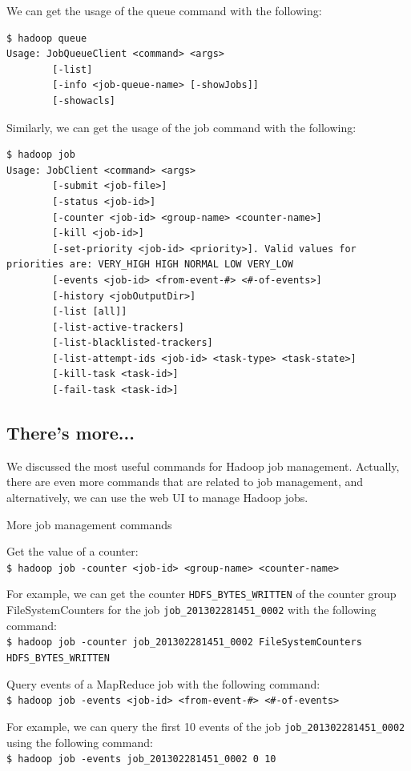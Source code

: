 We can get the usage of the queue command with the following:
\begin{verbatim}
$ hadoop queue
Usage: JobQueueClient <command> <args>
        [-list]
        [-info <job-queue-name> [-showJobs]]
        [-showacls]
\end{verbatim}

Similarly, we can get the usage of the job command with the following:
\begin{verbatim}
$ hadoop job
Usage: JobClient <command> <args>
        [-submit <job-file>]
        [-status <job-id>]
        [-counter <job-id> <group-name> <counter-name>]
        [-kill <job-id>]
        [-set-priority <job-id> <priority>]. Valid values for priorities are: VERY_HIGH HIGH NORMAL LOW VERY_LOW
        [-events <job-id> <from-event-#> <#-of-events>]
        [-history <jobOutputDir>]
        [-list [all]]
        [-list-active-trackers]
        [-list-blacklisted-trackers]
        [-list-attempt-ids <job-id> <task-type> <task-state>]
        [-kill-task <task-id>]
        [-fail-task <task-id>]
\end{verbatim}
\subsection*{There's more...}
We discussed the most useful commands for Hadoop job management. Actually, there are even more commands that are related to job management, and alternatively, we can use the web UI to manage Hadoop jobs.

More job management commands

Get the value of a counter: \\
\verb|$ hadoop job -counter <job-id> <group-name> <counter-name>|

For example, we can get the counter \verb|HDFS_BYTES_WRITTEN| of the counter group FileSystemCounters for the job \verb|job_201302281451_0002| with the following command: \\ 
\verb|$ hadoop job -counter job_201302281451_0002 FileSystemCounters HDFS_BYTES_WRITTEN| 

Query events of a MapReduce job with the following command: \\
\verb|$ hadoop job -events <job-id> <from-event-#> <#-of-events>|

For example, we can query the first 10 events of the job \verb|job_201302281451_0002| using the following command: \\
\verb|$ hadoop job -events job_201302281451_0002 0 10|

